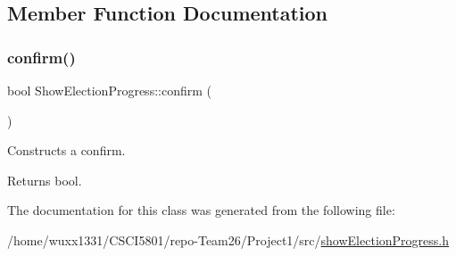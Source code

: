 \subsection{Member Function Documentation}
\mbox{\label{classShowElectionProgress_aa14bd4850bef1167305d62c70632306a}} 
\subsubsection{\texorpdfstring{confirm()}{confirm()}}
{\footnotesize\ttfamily bool Show\+Election\+Progress\+::confirm (\begin{DoxyParamCaption}{ }\end{DoxyParamCaption})}



Constructs a confirm. 

\begin{DoxyReturn}{Returns}
bool. 
\end{DoxyReturn}


The documentation for this class was generated from the following file\+:\begin{DoxyCompactItemize}
\item 
/home/wuxx1331/\+C\+S\+C\+I5801/repo-\/\+Team26/\+Project1/src/\hyperlink{showElectionProgress_8h}{show\+Election\+Progress.\+h}\end{DoxyCompactItemize}
